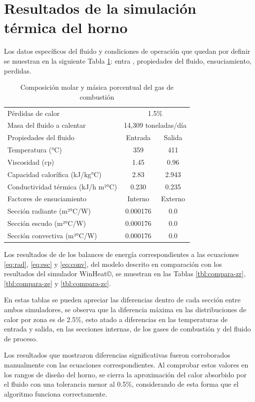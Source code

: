 \section{Resultados de la simulación térmica del horno}
\par Los datos específicos del fluido y condiciones de operación que quedan por definir se muestran en la siguiente Tabla \ref{tbl:props}:
entra , propiedades del fluido, ensuciamiento, perdidas.
\begin{table}[htb]\begin{center}
\caption[Datos del fluido y condiciones de operación]{Composición molar y másica porcentual del gas de combustión}
\label{tbl:props}\begin{tabular}{l|c|c}
	Pérdidas de calor      & \multicolumn{2}{c}{1.5\%} \\
	Masa del fluido a calentar  & \multicolumn{2}{c}{14,309 toneladas/día} \\
	\hline
    Propiedades del fluido  & Entrada   & Salida \\
    Temperatura          (°C)       & 359    & 411 \\
	Viscosidad	         (cp)	    & 1.45	& 0.96 \\
	Capacidad calorífica (kJ/kg°C)	& 2.83 	& 2.943	 \\
	Conductividad térmica (kJ/h m²°C) & 0.230& 0.235	 \\
	\hline
	Factores de ensuciamiento & Interno & Externo\\
	Sección radiante	(m²°C/W)  & 0.000176	& 0.0 \\
	Sección escudo		(m²°C/W)  & 0.000176	& 0.0 \\
	Sección convectiva	(m²°C/W)  & 0.000176	& 0.0 \\
\end{tabular}\end{center}\end{table}
\par Los resultados de de los balances de energía correspondientes a las ecuaciones \ref{eq:rad}, \ref{eq:esc} y \ref{eq:conv}, del modelo descrito en comparación con los resultados del simulador WinHeat\copyright, se muestran en las Tablas \ref{tbl:compara-zr}, \ref{tbl:compara-ze} y \ref{tbl:compara-zc}.
\par En estas tablas se pueden apreciar las diferencias dentro de cada sección entre ambos simuladores, se observa que la diferencia máxima en las distribuciones de calor por zona es de 2.5\%, esto atado a diferencias en las temperaturas de entrada y salida, en las secciones internas, de los gases de combustión y del fluido de proceso.
\par Los resultados que mostraron diferencias significativas fueron corroborados manualmente con las ecuaciones correspondientes. Al comprobar estos valores en los rangos de diseño del horno, se cierra la aproximación del calor absorbido por el fluido con una tolerancia menor al 0.5\%, considerando de esta forma que el algoritmo funciona correctamente.

